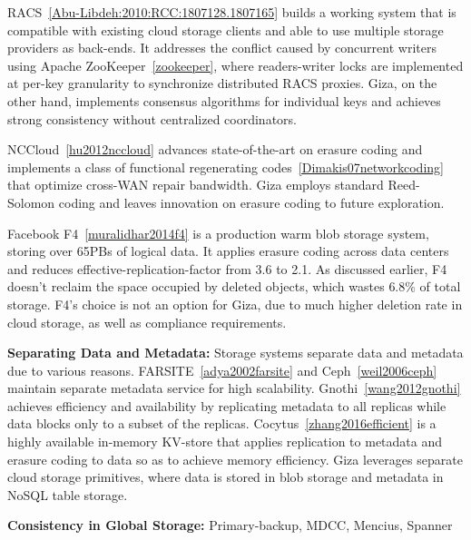 RACS~\ref{Abu-Libdeh:2010:RCC:1807128.1807165} 
builds a working system that is compatible with existing cloud storage clients and able to use multiple storage providers as back-ends.
It addresses the conflict caused by concurrent writers using Apache ZooKeeper~\ref{zookeeper}, where readers-writer locks are implemented at per-key granularity to synchronize distributed RACS proxies.
Giza, on the other hand, implements consensus algorithms for individual keys and achieves strong consistency without centralized coordinators.

NCCloud~\ref{hu2012nccloud} advances state-of-the-art on erasure coding and implements a class of functional regenerating codes~\ref{Dimakis07networkcoding} that optimize cross-WAN repair bandwidth. Giza employs standard Reed-Solomon coding and leaves innovation on erasure coding to future exploration.

Facebook F4~\ref{muralidhar2014f4} is a production warm blob storage system, storing over 65PBs of logical data. It applies erasure coding across data centers and reduces effective-replication-factor from 3.6 to 2.1. As discussed earlier, F4 doesn't reclaim the space occupied by deleted objects, which wastes $6.8\%$ of total storage. F4's choice is not an option for Giza, due to much higher deletion rate in cloud storage, as well as compliance requirements.


{\bf Separating Data and Metadata:}
Storage systems separate data and metadata due to various reasons. FARSITE~\ref{adya2002farsite} and Ceph~\ref{weil2006ceph} maintain separate metadata service for high scalability. Gnothi~\ref{wang2012gnothi} achieves efficiency and availability by replicating metadata to all replicas while data blocks only to a subset of the replicas. Cocytus~\ref{zhang2016efficient} is a highly available in-memory KV-store that applies replication to metadata and erasure coding to data so as to achieve memory efficiency.
Giza leverages separate cloud storage primitives, where data is stored in blob storage and metadata in NoSQL table storage.

{\bf Consistency in Global Storage:}
Primary-backup, MDCC, Mencius, Spanner


